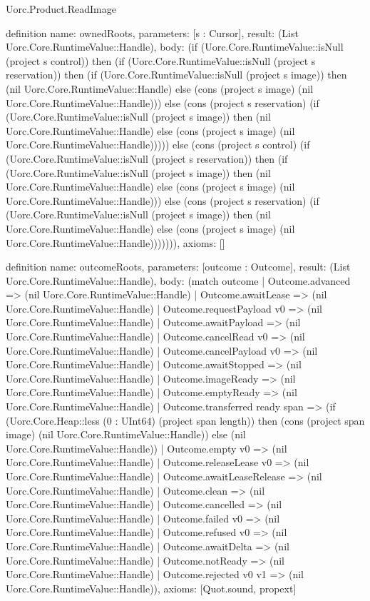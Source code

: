 \begin{lexlean}{Uorc.Product.ReadImage}
\begin{semanticmodule}
definition{
  name: ownedRoots,
  parameters: [s : Cursor],
  result: (List Uorc.Core.RuntimeValue::Handle),
  body: (if (Uorc.Core.RuntimeValue::isNull (project s control)) then (if (Uorc.Core.RuntimeValue::isNull (project s reservation)) then (if (Uorc.Core.RuntimeValue::isNull (project s image)) then (nil Uorc.Core.RuntimeValue::Handle) else (cons (project s image) (nil Uorc.Core.RuntimeValue::Handle))) else (cons (project s reservation) (if (Uorc.Core.RuntimeValue::isNull (project s image)) then (nil Uorc.Core.RuntimeValue::Handle) else (cons (project s image) (nil Uorc.Core.RuntimeValue::Handle))))) else (cons (project s control) (if (Uorc.Core.RuntimeValue::isNull (project s reservation)) then (if (Uorc.Core.RuntimeValue::isNull (project s image)) then (nil Uorc.Core.RuntimeValue::Handle) else (cons (project s image) (nil Uorc.Core.RuntimeValue::Handle))) else (cons (project s reservation) (if (Uorc.Core.RuntimeValue::isNull (project s image)) then (nil Uorc.Core.RuntimeValue::Handle) else (cons (project s image) (nil Uorc.Core.RuntimeValue::Handle))))))),
  axioms: []
}

definition{
  name: outcomeRoots,
  parameters: [outcome : Outcome],
  result: (List Uorc.Core.RuntimeValue::Handle),
  body: (match outcome
    | Outcome.advanced => (nil Uorc.Core.RuntimeValue::Handle)
    | Outcome.awaitLease => (nil Uorc.Core.RuntimeValue::Handle)
    | Outcome.requestPayload v0 => (nil Uorc.Core.RuntimeValue::Handle)
    | Outcome.awaitPayload => (nil Uorc.Core.RuntimeValue::Handle)
    | Outcome.cancelRead v0 => (nil Uorc.Core.RuntimeValue::Handle)
    | Outcome.cancelPayload v0 => (nil Uorc.Core.RuntimeValue::Handle)
    | Outcome.awaitStopped => (nil Uorc.Core.RuntimeValue::Handle)
    | Outcome.imageReady => (nil Uorc.Core.RuntimeValue::Handle)
    | Outcome.emptyReady => (nil Uorc.Core.RuntimeValue::Handle)
    | Outcome.transferred ready span => (if (Uorc.Core.Heap::less (0 : UInt64) (project span length)) then (cons (project span image) (nil Uorc.Core.RuntimeValue::Handle)) else (nil Uorc.Core.RuntimeValue::Handle))
    | Outcome.empty v0 => (nil Uorc.Core.RuntimeValue::Handle)
    | Outcome.releaseLease v0 => (nil Uorc.Core.RuntimeValue::Handle)
    | Outcome.awaitLeaseRelease => (nil Uorc.Core.RuntimeValue::Handle)
    | Outcome.clean => (nil Uorc.Core.RuntimeValue::Handle)
    | Outcome.cancelled => (nil Uorc.Core.RuntimeValue::Handle)
    | Outcome.failed v0 => (nil Uorc.Core.RuntimeValue::Handle)
    | Outcome.refused v0 => (nil Uorc.Core.RuntimeValue::Handle)
    | Outcome.awaitDelta => (nil Uorc.Core.RuntimeValue::Handle)
    | Outcome.notReady => (nil Uorc.Core.RuntimeValue::Handle)
    | Outcome.rejected v0 v1 => (nil Uorc.Core.RuntimeValue::Handle)),
  axioms: [Quot.sound, propext]
}


\end{semanticmodule}
\end{lexlean}
